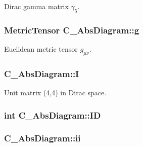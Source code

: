 Dirac gamma matrix $ \gamma_5 $. 

\hypertarget{class_c___abs_diagram_a4daaf1d6cbcb0aa0bc93417eb11b49a4}{
\subsubsection[{g}]{\setlength{\rightskip}{0pt plus 5cm}Metric\-Tensor C\-\_\-\-Abs\-Diagram\-::g\hspace{0.3cm}{\ttfamily [protected]}}}\label{class_c___abs_diagram_a4daaf1d6cbcb0aa0bc93417eb11b49a4}


Euclidean metric tensor $ g_{\mu\nu} $. 

\hypertarget{class_c___abs_diagram_aff57681049aaff10af1fd2a0151209b8}{
\subsubsection[{I}]{ C\-\_\-\-Abs\-Diagram\-::\-I\hspace{0.3cm}{\ttfamily [protected]}}}\label{class_c___abs_diagram_aff57681049aaff10af1fd2a0151209b8}


Unit matrix (4,4) in Dirac space. 

\hypertarget{class_c___abs_diagram_a08de955405ee0344287b2eb5f6cb62b5}{
\subsubsection[{I\-D}]{\setlength{\rightskip}{0pt plus 5cm}int C\-\_\-\-Abs\-Diagram\-::\-I\-D\hspace{0.3cm}{\ttfamily [protected]}}}\label{class_c___abs_diagram_a08de955405ee0344287b2eb5f6cb62b5}
\hypertarget{class_c___abs_diagram_aa3cfb09af9c9e81fa1af3a78b5d667a7}{
\subsubsection[{ii}]{ C\-\_\-\-Abs\-Diagram\-::ii\hspace{0.3cm}{\ttfamily [protected]}}}\label{class_c___abs_diagram_aa3cfb09af9c9e81fa1af3a78b5d667a7}


